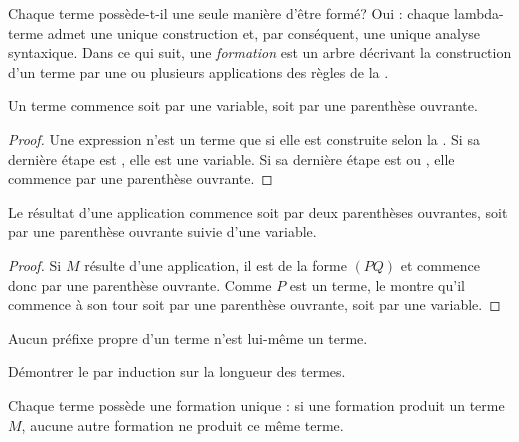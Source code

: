 \documentclass[../../../include/open-logic-section]{subfiles}
\begin{document}

Chaque terme possède-t-il une seule manière
d'être formé? Oui : chaque lambda-terme admet
une unique construction et, par conséquent,
une unique analyse syntaxique. Dans ce qui suit,
une \emph{formation} est un arbre décrivant la
construction d’un terme par une ou plusieurs
applications des règles de la .

\begin{lem}
Un terme commence soit par une variable,
soit par une parenthèse ouvrante.
\end{lem}

\begin{proof}
Une expression n'est un terme que si elle est
construite selon la .
Si sa dernière étape est
, elle est une variable.
Si sa dernière étape est
 ou
, elle commence
par une parenthèse ouvrante.
\end{proof}

\begin{lem}
Le résultat d'une application commence soit
par deux parenthèses ouvrantes, soit par une
parenthèse ouvrante suivie d'une variable.
\end{lem}

\begin{proof}
Si $M$ résulte d'une application, il est
de la forme $(PQ)$ et commence donc par
une parenthèse ouvrante. Comme $P$ est un
terme, le  montre qu'il
commence à son tour soit par une parenthèse
ouvrante, soit par une variable.
\end{proof}

\begin{lem}
Aucun préfixe propre d'un terme n'est lui-même
un terme.
\end{lem}

\begin{prob}
Démontrer le 
par induction sur la longueur des termes.
\end{prob}

\begin{prop} 
Chaque terme possède une formation unique :
si une formation produit un terme~$M$,
aucune autre formation ne produit ce même terme.
\end{prop}
\end{document}
